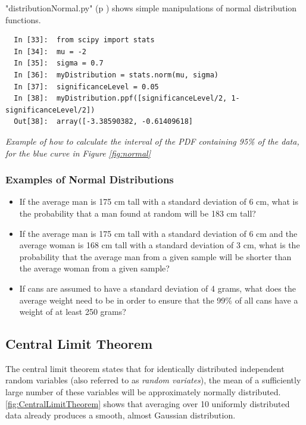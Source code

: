 \PyImg "distributionNormal.py" (p \pageref{py:distributionNormal}) shows simple manipulations of normal distribution functions.

\begin{lstlisting}
  In [33]:  from scipy import stats
  In [34]:  mu = -2
  In [35]:  sigma = 0.7
  In [36]:  myDistribution = stats.norm(mu, sigma)
  In [37]:  significanceLevel = 0.05
  In [38]:  myDistribution.ppf([significanceLevel/2, 1-significanceLevel/2])
  Out[38]:  array([-3.38590382, -0.61409618]
\end{lstlisting}
\emph{Example of how to calculate the interval of the PDF containing 95\% of the data, for the blue curve in Figure \ref{fig:normal}}

\subsubsection{Examples of Normal Distributions}

\begin{itemize}
    \item{}If the average man is 175 cm tall with a standard deviation of 6 cm, what is the probability that a man found at random will be 183 cm tall?
    \item{}If the average man is 175 cm tall with a standard deviation of 6 cm and the average woman is 168 cm tall with a standard deviation of 3 cm, what is the probability that the average man from a given sample will be shorter than the average woman from a given sample?
    \item{}If cans are assumed to have a standard deviation of 4 grams, what does the average weight need to be in order to ensure that the 99\% of all cans have a weight of at least 250 grams?
\end{itemize}

\subsection{Central Limit Theorem}\label{sec:CentralLimitTheorem}
The central limit theorem states that for identically distributed independent random variables (also referred to as \emph{random variates}), the mean of a sufficiently large number of these variables will be approximately normally distributed.
\ref{fig:CentralLimitTheorem} shows that averaging over 10 uniformly distributed data already produces a smooth, almost Gaussian distribution.

